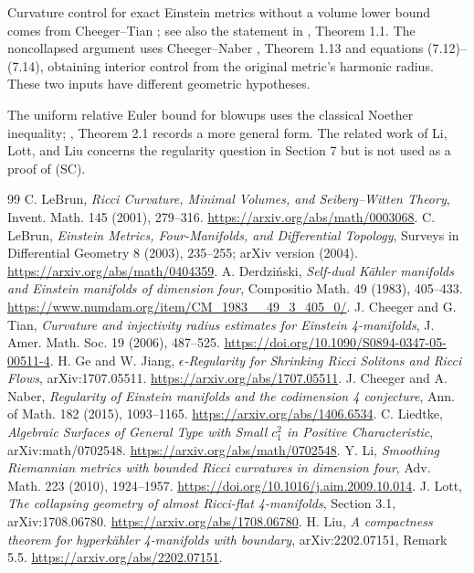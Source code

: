 \documentclass[a4paper,11pt]{article}
\theoremstyle{paper}
\numberwithin{equation}{section}
\begin{document}
Curvature control for exact Einstein metrics without a volume lower bound comes from Cheeger--Tian \cite{ct}; see also the statement in \cite{gejiang}, Theorem 1.1. The noncollapsed argument uses Cheeger--Naber \cite{cn}, Theorem 1.13 and equations (7.12)--(7.14), obtaining interior control from the original metric's harmonic radius. These two inputs have different geometric hypotheses.

The uniform relative Euler bound for blowups uses the classical Noether inequality; \cite{liedtke}, Theorem 2.1 records a more general form. The related work of Li, Lott, and Liu \cite{li,lott,liu} concerns the regularity question in Section 7 but is not used as a proof of (SC).

\begin{thebibliography}{99}
C. LeBrun, \emph{Ricci Curvature, Minimal Volumes, and Seiberg--Witten Theory}, Invent. Math. 145 (2001), 279--316.
\url{https://arxiv.org/abs/math/0003068}.
C. LeBrun, \emph{Einstein Metrics, Four-Manifolds, and Differential Topology}, Surveys in Differential Geometry 8 (2003), 235--255; arXiv version (2004).
\url{https://arxiv.org/abs/math/0404359}.
A. Derdzi\'nski, \emph{Self-dual K\"ahler manifolds and Einstein manifolds of dimension four}, Compositio Math. 49 (1983), 405--433.
\url{https://www.numdam.org/item/CM_1983__49_3_405_0/}.
J. Cheeger and G. Tian, \emph{Curvature and injectivity radius estimates for Einstein 4-manifolds}, J. Amer. Math. Soc. 19 (2006), 487--525.
\url{https://doi.org/10.1090/S0894-0347-05-00511-4}.
H. Ge and W. Jiang, \emph{$\epsilon$-Regularity for Shrinking Ricci Solitons and Ricci Flows}, arXiv:1707.05511.
\url{https://arxiv.org/abs/1707.05511}.
J. Cheeger and A. Naber, \emph{Regularity of Einstein manifolds and the codimension 4 conjecture}, Ann. of Math. 182 (2015), 1093--1165.
\url{https://arxiv.org/abs/1406.6534}.
C. Liedtke, \emph{Algebraic Surfaces of General Type with Small $c_1^2$ in Positive Characteristic}, arXiv:math/0702548.
\url{https://arxiv.org/abs/math/0702548}.
Y. Li, \emph{Smoothing Riemannian metrics with bounded Ricci curvatures in dimension four}, Adv. Math. 223 (2010), 1924--1957.
\url{https://doi.org/10.1016/j.aim.2009.10.014}.
J. Lott, \emph{The collapsing geometry of almost Ricci-flat 4-manifolds}, Section 3.1, arXiv:1708.06780.
\url{https://arxiv.org/abs/1708.06780}.
H. Liu, \emph{A compactness theorem for hyperkähler 4-manifolds with boundary}, arXiv:2202.07151, Remark 5.5.
\url{https://arxiv.org/abs/2202.07151}.
\end{thebibliography}
\end{document}
